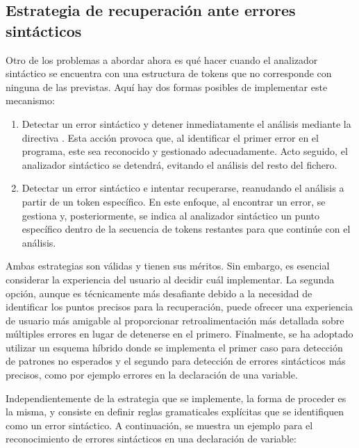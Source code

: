 \subsection{Estrategia de recuperación ante errores sintácticos}
Otro de los problemas a abordar ahora es qué hacer cuando el analizador sintáctico se encuentra con una estructura de tokens que no corresponde con ninguna de las previstas. Aquí hay dos formas posibles de implementar este mecanismo:

\begin{enumerate}
    \item Detectar un error sintáctico y detener inmediatamente el análisis mediante la directiva . Esta acción provoca que, al identificar el primer error en el programa, este sea reconocido y gestionado adecuadamente. Acto seguido, el analizador sintáctico se detendrá, evitando el análisis del resto del fichero.
    
    \item Detectar un error sintáctico e intentar recuperarse, reanudando el análisis a partir de un token específico. En este enfoque, al encontrar un error, se gestiona y, posteriormente, se indica al analizador sintáctico un punto específico dentro de la secuencia de tokens restantes para que continúe con el análisis.
\end{enumerate}

Ambas estrategias son válidas y tienen sus méritos. Sin embargo, es esencial considerar la experiencia del usuario al decidir cuál implementar. La segunda opción, aunque es técnicamente más desafiante debido a la necesidad de identificar los puntos precisos para la recuperación, puede ofrecer una experiencia de usuario más amigable al proporcionar retroalimentación más detallada sobre múltiples errores en lugar de detenerse en el primero. Finalmente, se ha adoptado utilizar un esquema híbrido donde se implementa el primer caso para detección de patrones no esperados y el segundo para detección de errores sintácticos más precisos, como por ejemplo errores en la declaración de una variable.



Independientemente de la estrategia que se implemente, la forma de proceder es la misma, y consiste en definir reglas gramaticales explícitas que se identifiquen como un error sintáctico. A continuación, se muestra un ejemplo para el reconocimiento de errores sintácticos en una declaración de variable:

